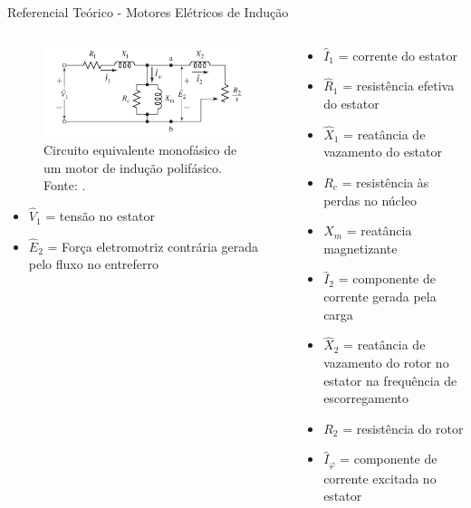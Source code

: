 \documentclass[aspectratio=169]{beamer}
\begin{document}
\begin{frame}{Referencial Teórico - Motores Elétricos de Indução}
	\begin{columns}
    	\begin{column}{0.50\textwidth}
			\begin{figure}[HT]
				\begin{center}
					\captionsetup{justification=justified}
					\includegraphics[scale=.22]{../referencial/img/circuit_fitzgerald_p354.png}
					\caption{Circuito equivalente monofásico de um motor de indução polifásico. \newline
					Fonte: .} 
					\label{fig:circuit_fitzgerald_p354}
				\end{center}
			\end{figure}
			\begin{itemize}
				\item $\hat{V}_1$ = tensão no estator
				\item $\hat{E}_2$ = Força eletromotriz contrária gerada pelo fluxo no entreferro
			\end{itemize}
     	\end{column}
		
		\begin{column}{0.5\textwidth}
			\begin{itemize}
				\item $\hat{I}_1$ = corrente do estator
				\item $\hat{R}_1$ = resistência efetiva do estator
				\item $\hat{X}_1$ = reatância de vazamento do estator
				\item $R_c$ = resistência às perdas no núcleo
				\item $X_m$ = reatância magnetizante
				\item $\hat{I}_2$ = componente de corrente gerada pela carga
				\item $\hat{X}_2$ = reatância de vazamento do rotor no estator na frequência de escorregamento
				\item $R_2$ = resistência do rotor
				\item $\hat{I}_\varphi$ = componente de corrente \newline 
				excitada no estator
			\end{itemize}
	 	\end{column}
	 \end{columns}
\end{frame}
\end{document}
